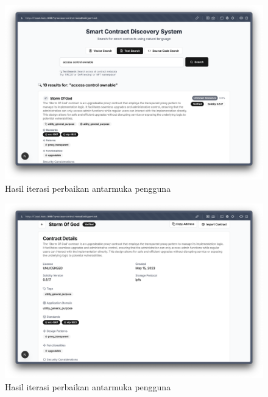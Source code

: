 \begin{figure}[ht]
	\centering
	\includegraphics[width=1\textwidth]{resources/appendix/hasil-iterasi-gui-3.png}
	\caption{Hasil iterasi perbaikan antarmuka pengguna}
	\label{image:hasil-iterasi-gui-3}
\end{figure}

\begin{figure}[ht]
	\centering
	\includegraphics[width=1\textwidth]{resources/appendix/hasil-iterasi-gui-4.png}
	\caption{Hasil iterasi perbaikan antarmuka pengguna}
	\label{image:hasil-iterasi-gui-4}
\end{figure}